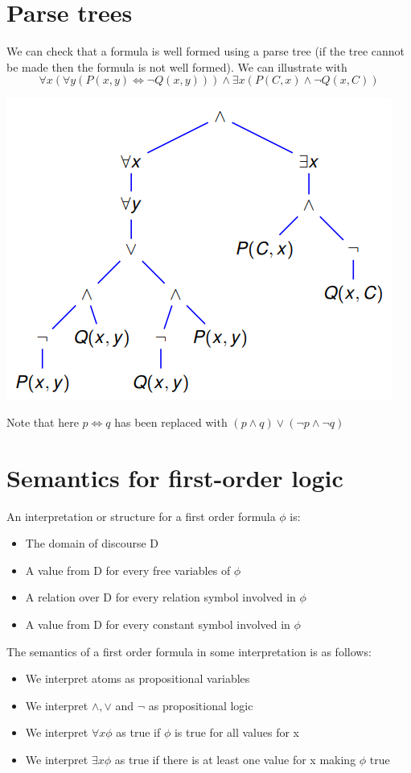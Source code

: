 \documentclass{article}[18pt]
\begin{document}
\section{Parse trees}
We can check that a formula is well formed using a parse tree (if the tree cannot be made then the formula is not well formed). We can illustrate with
$$\forall x ( \forall y ( P ( x , y ) \Leftrightarrow \neg Q ( x , y ) ) ) \wedge \exists x ( P ( C , x ) \wedge \neg Q ( x , C ) )$$
\begin{center}
\includegraphics[scale=0.7]{tree}
\end{center}
Note that here $p\Leftrightarrow q$ has been replaced with $(p\land q)\lor (\lnot p \land \lnot q)$
\section{Semantics for first-order logic}
An interpretation or structure for a first order formula $\phi$ is:
\begin{itemize}
\item The domain of discourse D
\item A value from D for every free variables of $\phi$
\item A relation over D for every relation symbol involved in $\phi$
\item A value from D for every constant symbol involved in $\phi$
\end{itemize}
The semantics of a first order formula in some interpretation is as follows:
\begin{itemize}
\item We interpret atoms as propositional variables
\item We interpret $\land, \lor$ and $\lnot$ as propositional logic
\item We interpret $\forall x \phi$ as true if $\phi$ is true for all values for x
\item We interpret $\exists x \phi$ as true if there is at least one value for x making $\phi$ true
\end{itemize}
\end{document}
